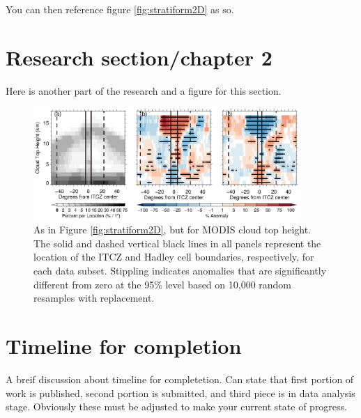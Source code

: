 \documentclass[oneside,letterpaper,12pt]{article}
\begin{document}
You can then reference figure \ref{fig:stratiform2D} as so.

\section*{Research section/chapter 2}
Here is another part of the research and a figure for this section.

\begin{figure}[!b]
	\centering
	\includegraphics[width=0.9\textwidth]{./Figures/cloudHeightAqua.eps}
	\caption{
		As in Figure \ref{fig:stratiform2D}, but for MODIS cloud top height.
		The solid and dashed vertical black lines in all panels represent the location of the ITCZ and Hadley cell boundaries, respectively, for each data subset.
		Stippling indicates anomalies that are significantly different from zero at the 95\% level based on 10,000 random resamples with replacement.
	}
	\label{fig:modis}
\end{figure}

\section{Timeline for completion}
A breif discussion about timeline for completetion.
Can state that first portion of work is published, second portion is submitted, and third piece is in data analysis stage.
Obviously these must be adjusted to make your current state of progress.


\end{document}
